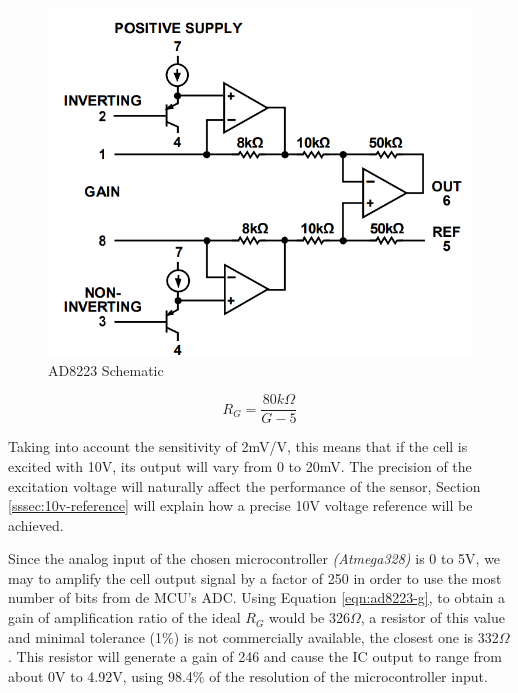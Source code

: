 		\begin{figure}[htbp]
			\centering
				\includegraphics[scale=1.2]{figuras/fig-ad8223-functional-block.png}
			\caption{AD8223 Schematic \cite{ad8223-datasheet}}
			\label{fig:ad8223-schematic}
		\end{figure}

		\begin{equation}\label{eqn:ad8223-g}
			R_{G}=\frac{80k\Omega}{G - 5}
		\end{equation}

		Taking into account the sensitivity of 2mV/V, this means that if the cell is excited with 10V, its output will vary from 0 to 20mV. The precision of the excitation voltage will naturally affect the performance of the sensor, Section \ref{sssec:10v-reference} will explain how a precise 10V voltage reference will be achieved.
		\par
		Since the analog input of the chosen microcontroller \textit{(Atmega328)} is 0 to 5V, we may to amplify the cell output signal by a factor of 250 in order to use the most number of bits from de MCU's ADC. Using Equation \ref{eqn:ad8223-g}, to obtain a gain of amplification ratio of the ideal $R_{G}$ would be 326$\Omega$, a resistor of this value and minimal tolerance (1$\%$) is not commercially available, the closest one is 332$\Omega$. This resistor will generate a gain of 246 and cause the IC output to range from about 0V to 4.92V, using 98.4\% of the resolution of the microcontroller input. 
		\par

